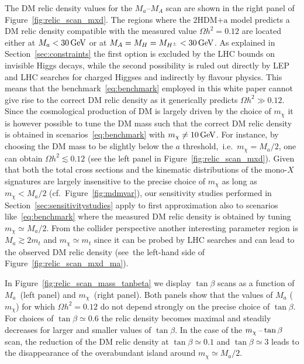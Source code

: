 \documentclass[a4paper, 11pt,notoc]{article}
\newcommand{\mA}{\ensuremath{M_{A}}\xspace}
\newcommand{\ma}{\ensuremath{M_{a}}\xspace}
\newcommand{\mH}{\ensuremath{M_{H}}\xspace}
\newcommand{\mHc}{\ensuremath{M_{H^{\pm}}}\xspace}
\newcommand{\hdma}{\ensuremath{\textrm{2HDM+a}}\xspace}
\begin{document}
 The DM relic density values for the $\ma$--$\mA$ scan  are shown in the right panel of Figure~\ref{fig:relic_scan_mxd}. The regions where the \hdma model predicts a DM relic density compatible with the measured value $\Omega h^{2} = 0.12$ are located either at $\ma < 30 \, {\rm GeV}$ or at $\mA=\mH=\mHc < 30 \, {\rm GeV}$. As explained in Section~\ref{sec:constraints} the first option is excluded by the LHC bounds on invisible Higgs decays, while the second possibility is ruled out directly by LEP and LHC searches for charged Higgses and indirectly by flavour physics. This means that the benchmark~\eqref{eq:benchmark} employed in this white paper cannot give rise to the correct DM relic density as it generically predicts $\Omega h^{2} \gg 0.12$.  Since the cosmological production of DM is largely driven by the choice of $m_\chi$ it is however possible to tune the DM mass such that the correct DM relic density is obtained in scenarios~\eqref{eq:benchmark} with $m_\chi \neq 10 \, {\rm GeV}$.  For instance, by choosing the DM mass to be slightly below the $a$ threshold,~i.e.~$m_\chi = \ma/2$, one can obtain $\Omega h^{2} \lesssim 0.12$ (see the left panel in Figure~\ref{fig:relic_scan_mxd}). Given that both the total cross sections and the kinematic distributions of the mono-$X$ signatures are largely insensitive to the precise choice of $m_\chi$ as long as $m_\chi < \ma/2$ (cf.~Figure~\ref{fig:mdmvar}), our sensitivity studies performed in Section~\ref{sec:sensitivitystudies} apply to first approximation also to scenarios like~\eqref{eq:benchmark} where the measured DM relic density is obtained by tuning $ m_\chi \simeq \ma/2$. From the collider perspective another interesting parameter region is $M_a \gtrsim  2 m_t$ and $m_\chi \simeq m_t$ since it can be probed by LHC searches and can lead to the observed DM relic density (see~the left-hand side of Figure~\ref{fig:relic_scan_mxd_ma}).  

 In Figure~\ref{fig:relic_scan_mass_tanbeta} we display $\tan \beta$ scans as a function of $\ma$~(left panel) and $m_\chi$~(right panel). Both panels show that the values of $\ma$ ($m_\chi$) for which $\Omega h^{2} = 0.12$ do not depend strongly on the precise choice of $\tan \beta$. For choices of $\tan \beta \simeq 0.6$ the relic density becomes maximal and steadily decreases for larger and smaller values of $\tan \beta$. In the case of the $m_\chi \hspace{0.5mm}$--$\hspace{0.5mm} \tan \beta$ scan, the reduction of the DM relic density at $\tan \beta \simeq 0.1$ and $\tan \beta \simeq 3$  leads to the disappearance of the overabundant island around $m_\chi\simeq\ma/2$.
 
\end{document}
